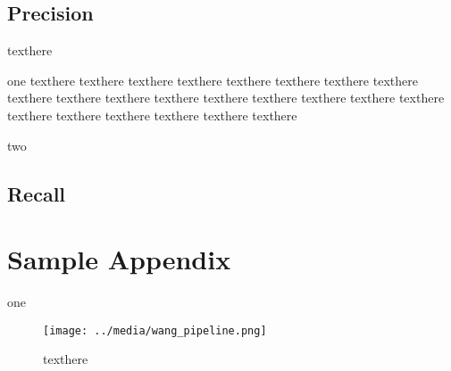 \subsection{Precision}
texthere

one texthere texthere texthere texthere texthere texthere texthere texthere texthere texthere texthere texthere texthere texthere texthere texthere texthere texthere texthere texthere texthere texthere texthere

two


\subsection{Recall}

\section{Sample Appendix}
one

\begin{figure}[ht] %
    \texttt{[image: ../media/wang\_pipeline.png]}
    \caption{texthere}
    \label{delme} %
\end{figure}


